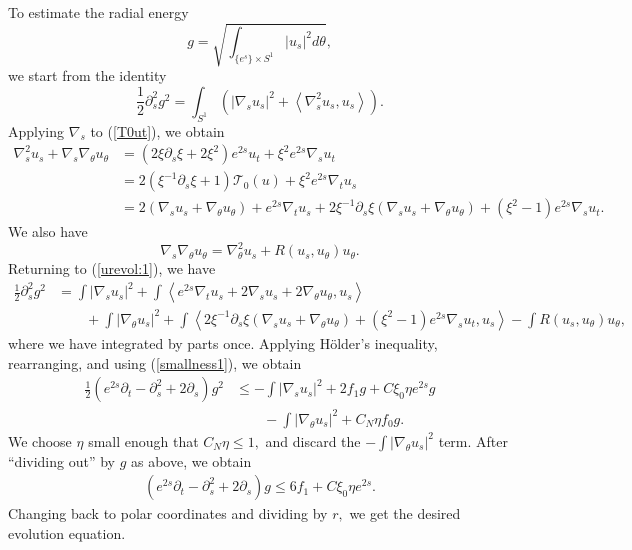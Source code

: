 \documentclass[12pt]{amsart}
\newcommand{\LA}{\left\langle}
\newcommand{\RA}{\right\rangle}
\newcommand{\T}{{\mathcal T}}
\theoremstyle{others}
\numberwithin{equation}{section}
\def\<{\left\langle} \def\>{\right\rangle}
\def\({\left(} \def\){\right)}
\renewcommand{\th}{\theta}
\newcommand{\p}{\partial}
\newcommand{\n}{\nabla}
\begin{document}
To estimate the radial energy
$$g = \sqrt{ \int_{ \{e^s\} \times S^1 } |u_s|^2 d\th },$$
we start from the identity
\begin{equation}\label{urevol:1}
 \frac12 \p_s^2 g^2= \int_{S^1}\( |\n_s u_s|^2+\< \n_s^2u_{s}, u_s\>\).
\end{equation}
Applying $\n_s$ to (\ref{T0ut}), we obtain
\begin{equation*}
\begin{split}
\nabla^2_s u_s + \nabla_s \nabla_\theta u_\theta & = \left( 2 \xi \partial_s \xi + 2 \xi^2 \right) e^{2s}  u_t + \xi^2 e^{2s} \nabla_s u_t \\
& = 2 \left( \xi^{-1} \partial_s \xi + 1 \right) \T_0(u) + \xi^2 e^{2s} \nabla_t u_s \\
& = 2 \left( \nabla_s u_s + \nabla_\theta u_\theta \right) + e^{2s} \nabla_t u_s + 2 \xi^{-1} \partial_s \xi (\nabla_s u_s + \nabla_\theta u_\theta)+ \left( \xi^2 - 1 \right) e^{2s} \nabla_s u_t.
\end{split}
\end{equation*}
We also have
$$\nabla_s \nabla_\theta u_\theta = \nabla_\theta^2 u_s + R(u_s, u_\theta) u_\theta.$$
Returning to (\ref{urevol:1}), we have
\begin{equation*}
\begin{split}
\frac12 \partial_s^2 g^2 & = \int |\nabla_s u_s|^2 + \int \LA e^{2s} \nabla_t u_s + 2 \nabla_s u_s + 2 \nabla_\theta u_\theta , u_s \RA \\
& \qquad + \int |\nabla_\theta u_s |^2 + \int \LA 2 \xi^{-1} \partial_s \xi \left( \nabla_s u_s + \nabla_\theta u_\theta \right) + (\xi^2 - 1) e^{2s} \nabla_s u_t , u_s \RA - \int R(u_s, u_\theta) u_\theta,
\end{split}
\end{equation*}
where we have integrated by parts once.
Applying H\"older's inequality, rearranging, and using (\ref{smallness1}), we obtain
\begin{equation*}
\begin{split}
\frac12 \left( e^{2s} \partial_t - \partial_s^2 + 2 \partial_s \right) g^2 & \leq - \int |\nabla_s u_s|^2  + 2 f_1 g + C \xi_0  \eta e^{2s} g \\
& \qquad - \int |\nabla_\theta u_s |^2 + C_N \eta f_0 g.
\end{split}
\end{equation*}
We choose $\eta$ small enough that $C_N \eta \leq 1,$ and discard the $-\int |\nabla_\theta u_s|^2$ term. After ``dividing out'' by $g$ as above, we obtain
\begin{equation}\label{urevol:2}
\begin{split}
\left( e^{2s} \partial_t - \partial_s^2 + 2 \partial_s \right) g \leq 6f_1 + C \xi_0 \eta e^{2s}.
\end{split}
\end{equation}
Changing back to polar coordinates and dividing by $r,$ we get the desired evolution equation.
\end{document}
